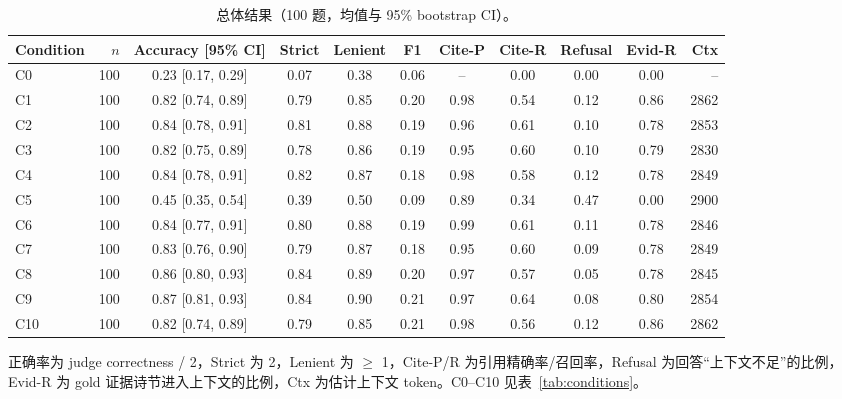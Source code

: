 \begin{table}[H]
\centering
\caption{总体结果（100 题，均值与 95\% bootstrap CI）。}
\label{tab:main}
\scriptsize
\setlength{\tabcolsep}{3.0pt}
\begin{threeparttable}
\begin{tabular}{@{}l r c c c c c c c c r@{}}
\toprule
Condition & $n$ & Accuracy [95\% CI] & Strict & Lenient & F1 & Cite-P & Cite-R & Refusal & Evid-R & Ctx \\
\midrule
C0 & 100 & 0.23 [0.17, 0.29] & 0.07 & 0.38 & 0.06 & -- & 0.00 & 0.00 & 0.00 & -- \\
C1 & 100 & 0.82 [0.74, 0.89] & 0.79 & 0.85 & 0.20 & 0.98 & 0.54 & 0.12 & 0.86 & 2862 \\
C2 & 100 & 0.84 [0.78, 0.91] & 0.81 & 0.88 & 0.19 & 0.96 & 0.61 & 0.10 & 0.78 & 2853 \\
C3 & 100 & 0.82 [0.75, 0.89] & 0.78 & 0.86 & 0.19 & 0.95 & 0.60 & 0.10 & 0.79 & 2830 \\
C4 & 100 & 0.84 [0.78, 0.91] & 0.82 & 0.87 & 0.18 & 0.98 & 0.58 & 0.12 & 0.78 & 2849 \\
C5 & 100 & 0.45 [0.35, 0.54] & 0.39 & 0.50 & 0.09 & 0.89 & 0.34 & 0.47 & 0.00 & 2900 \\
C6 & 100 & 0.84 [0.77, 0.91] & 0.80 & 0.88 & 0.19 & 0.99 & 0.61 & 0.11 & 0.78 & 2846 \\
C7 & 100 & 0.83 [0.76, 0.90] & 0.79 & 0.87 & 0.18 & 0.95 & 0.60 & 0.09 & 0.78 & 2849 \\
C8 & 100 & 0.86 [0.80, 0.93] & 0.84 & 0.89 & 0.20 & 0.97 & 0.57 & 0.05 & 0.78 & 2845 \\
C9 & 100 & 0.87 [0.81, 0.93] & 0.84 & 0.90 & 0.21 & 0.97 & 0.64 & 0.08 & 0.80 & 2854 \\
C10 & 100 & 0.82 [0.74, 0.89] & 0.79 & 0.85 & 0.21 & 0.98 & 0.56 & 0.12 & 0.86 & 2862 \\
\bottomrule
\end{tabular}
\begin{tablenotes}\scriptsize
\item 正确率为 judge correctness / 2，Strict 为 2，Lenient 为 $\ge$ 1，Cite-P/R 为引用精确率/召回率，Refusal 为回答“上下文不足”的比例，Evid-R 为 gold 证据诗节进入上下文的比例，Ctx 为估计上下文 token。C0--C10 见表~\ref{tab:conditions}。
\end{tablenotes}
\end{threeparttable}
\end{table}
